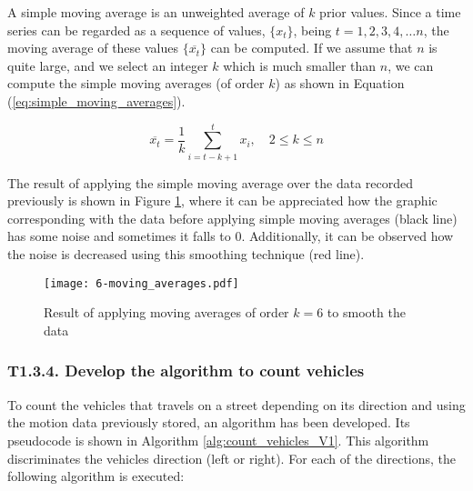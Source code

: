 A simple moving average \cite{Smi15} is an unweighted average of $k$ prior values. Since a time series can be regarded as a sequence of values, $\{x_{t}\}$, being $t=1,2,3,4,…n$, the moving average of these values $\{\overline {x_{t}}\}$ can be computed. If we assume that $n$ is quite large, and we select an integer $k$ which is much smaller than $n$, we can compute the simple moving averages (of order $k$) as shown in Equation (\ref{eq:simple_moving_averages}).

\begin{equation} \label{eq:simple_moving_averages}
\overline { { x }_{ t } } =\frac { 1 }{ k } \sum _{ i=t-k+1 }^{ t }{ { x }_{ i } } ,\quad 2\le k\le n
\end{equation}

The result of applying the simple moving average over the data recorded previously is shown in Figure \ref{fig:6-moving_averages}, where it can be appreciated how the graphic corresponding with the data before applying simple moving averages (black line) has some noise and sometimes it falls to 0. Additionally, it can be observed how the noise is decreased using this smoothing technique (red line).

\begin{figure}[!h]
	\begin{center}
		\texttt{[image: 6-moving\_averages.pdf]}
		\caption{Result of applying moving averages of order $k = 6$ to smooth the data}
		\label{fig:6-moving_averages}
	\end{center}
\end{figure}


\subsubsection{T1.3.4. Develop the algorithm to count vehicles}
To count the vehicles that travels on a street depending on its direction and using the motion data previously stored, an algorithm has been developed. Its pseudocode is shown in Algorithm \ref{alg:count_vehicles_V1}. This algorithm discriminates the vehicles direction (left or right). For each of the directions, the following algorithm is executed: 


